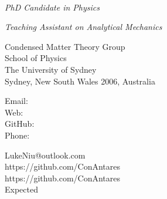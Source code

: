 \documentclass[12pt,a4paper,utf8]{report}
\newcommand{\namefont}[1]{{\normalfont\bfseries\Huge{#1}}}
\newcommand{\myname}{Lu Niu}
\newcommand{\mydegree}{PhD Candidate in Physics}
\newcommand{\mywork}{Teaching Assistant on Analytical Mechanics}
\begin{document}
\begin{minipage}[t]{8cm}
    \begin{center}
        \vspace{0.0cm}\namefont{\myname}\\[0.1cm]
    \end{center}
\end{minipage}
\begin{minipage}[t]{8cm}
    \vspace{0.0cm}
    {\em{\mydegree}}\par
    {\em{\mywork}}\par
\end{minipage}

\begin{minipage}[t]{8cm}
    \vspace{0.4cm}
    Condensed Matter Theory Group \\
    School of Physics \\
    The University of Sydney \\
    Sydney, New South Wales 2006, Australia\\
\end{minipage}
\begin{minipage}[t]{1.5cm}
    \vspace{0.4cm}
    Email: \\
    Web: \\
    GitHub: \\
    Phone: \\
\end{minipage}
\begin{minipage}[t]{8cm}
    \vspace{0.4cm}
    LukeNiu@outlook.com \\
    https://github.com/ConAntares \\
    https://github.com/ConAntares \\
    Expected\\
\end{minipage}
\vspace{-0.2cm}
\end{document}
